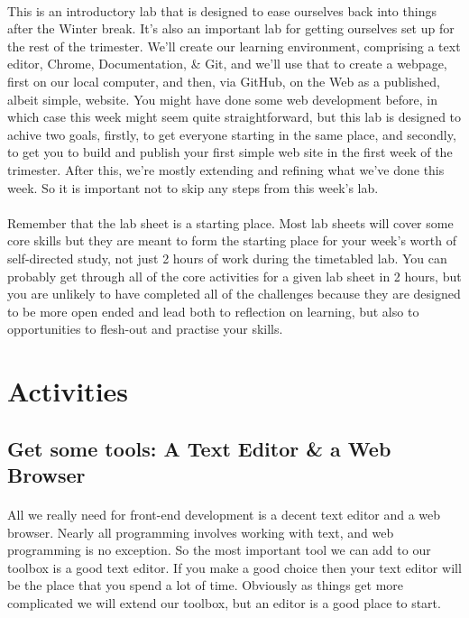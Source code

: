 \documentclass[10pt, a4paper]{article}
\begin{document}
\paragraph{} This is an introductory lab that is designed to ease ourselves back into things after the Winter break. It's also an important lab for getting ourselves set up for the rest of the trimester. We'll create our learning environment, comprising a text editor, Chrome, Documentation, \& Git, and we'll use that to create a webpage, first on our local computer, and then, via GitHub, on the Web as a published, albeit simple, website. You might have done some web development before, in which case this week might seem quite straightforward, but this lab is designed to achive two goals, firstly, to get everyone starting in the same place, and secondly, to get you to build and publish your first simple web site in the first week of the trimester. After this, we're mostly extending and refining what we've done this week. So it is important not to skip any steps from this week's lab.

\paragraph{} Remember that the lab sheet is a starting place. Most lab sheets will cover some core skills but they are meant to form the starting place for your week's worth of self-directed study, not just 2 hours of work during the timetabled lab. You can probably get through all of the core activities for a given lab sheet in 2 hours, but you are unlikely to have completed all of the challenges because they are designed to be more open ended and lead both to reflection on learning, but also to opportunities to flesh-out and practise your skills.

\section{Activities}

\subsection{Get some tools: A Text Editor \& a Web Browser}

\paragraph{} All we really need for front-end development is a decent text editor and a web browser. Nearly all programming involves working with text, and web programming is no exception. So the most important tool we can add to our toolbox is a good text editor. If you make a good choice then your text editor will be the place that you spend a lot of time. Obviously as things get more complicated we will extend our toolbox, but an editor is a good place to start.
\end{document}
